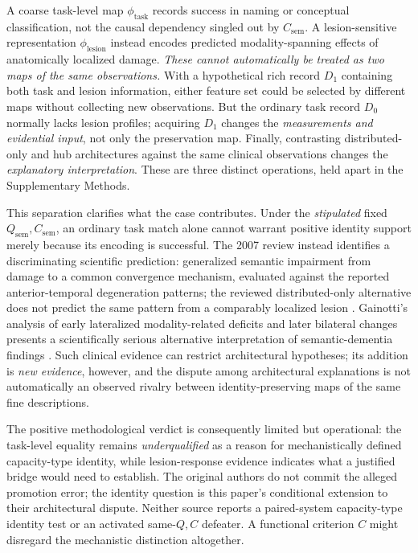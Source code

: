 \documentclass[11pt]{article}
\begin{document}
A coarse task-level map \(\phi_{\mathrm{task}}\) records success in naming or conceptual classification, not the causal dependency singled out by \(C_{\mathrm{sem}}\). A lesion-sensitive representation \(\phi_{\mathrm{lesion}}\) instead encodes predicted modality-spanning effects of anatomically localized damage. \emph{These cannot automatically be treated as two maps of the same observations.} With a hypothetical rich record \(D_1\) containing both task and lesion information, either feature set could be selected by different maps without collecting new observations. But the ordinary task record \(D_0\) normally lacks lesion profiles; acquiring \(D_1\) changes the \emph{measurements and evidential input}, not only the preservation map. Finally, contrasting distributed-only and hub architectures against the same clinical observations changes the \emph{explanatory interpretation}. These are three distinct operations, held apart in the Supplementary Methods.

This separation clarifies what the case contributes. Under the \emph{stipulated} fixed \(Q_{\mathrm{sem}},C_{\mathrm{sem}}\), an ordinary task match alone cannot warrant positive identity support merely because its encoding is successful. The 2007 review instead identifies a discriminating scientific prediction: generalized semantic impairment from damage to a common convergence mechanism, evaluated against the reported anterior-temporal degeneration patterns; the reviewed distributed-only alternative does not predict the same pattern from a comparably localized lesion \citep{PattersonNestorRogers2007Semantic}. Gainotti's analysis of early lateralized modality-related deficits and later bilateral changes presents a scientifically serious alternative interpretation of semantic-dementia findings \citep{Gainotti2012SemanticFormat}. Such clinical evidence can restrict architectural hypotheses; its addition is \emph{new evidence}, however, and the dispute among architectural explanations is not automatically an observed rivalry between identity-preserving maps of the same fine descriptions.

The positive methodological verdict is consequently limited but operational: the task-level equality remains \emph{underqualified} as a reason for mechanistically defined capacity-type identity, while lesion-response evidence indicates what a justified bridge would need to establish. The original authors do not commit the alleged promotion error; the identity question is this paper's conditional extension to their architectural dispute. Neither source reports a paired-system capacity-type identity test or an activated same-\(Q,C\) defeater. A functional criterion \(C\) might disregard the mechanistic distinction altogether.
\end{document}
